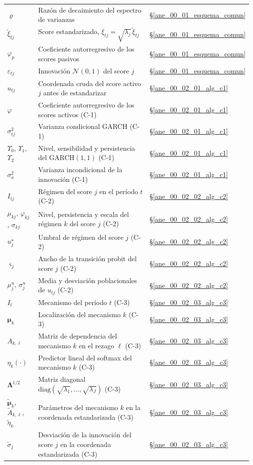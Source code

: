 \begin{longtable}{p{} p{} p{}}
$\varrho$ & Razón de decaimiento del espectro de varianzas & \S\ref{ane_00_01_esquema_comun} \\
$\tilde{\xi}_{tj}$ & Score estandarizado, $\xi_{tj} = \sqrt{\lambda_j}\,\tilde{\xi}_{tj}$ & \S\ref{ane_00_01_esquema_comun} \\
$\varphi_p$ & Coeficiente autorregresivo de los scores pasivos & \S\ref{ane_00_01_esquema_comun} \\
$\varepsilon_{tj}$ & Innovación $\mathcal{N}(0,1)$ del score $j$ & \S\ref{ane_00_01_esquema_comun} \\
$u_{tj}$ & Coordenada cruda del score activo $j$ antes de estandarizar & \S\ref{ane_00_02_01_alg_c1} \\
$\varphi$ & Coeficiente autorregresivo de los scores activos (C-1) & \S\ref{ane_00_02_01_alg_c1} \\
$\sigma_{tj}^2$ & Varianza condicional GARCH (C-1) & \S\ref{ane_00_02_01_alg_c1} \\
$\Upsilon_0$, $\Upsilon_1$, $\Upsilon_2$ & Nivel, sensibilidad y persistencia del GARCH$(1,1)$ (C-1) & \S\ref{ane_00_02_01_alg_c1} \\
$\sigma_a^2$ & Varianza incondicional de la innovación (C-1) & \S\ref{ane_00_02_01_alg_c1} \\
$I_{tj}$ & Régimen del score $j$ en el período $t$ (C-2) & \S\ref{ane_00_02_02_alg_c2} \\
$\mu_{kj}$, $\varphi_{kj}$, $\sigma_{kj}$ & Nivel, persistencia y escala del régimen $k$ del score $j$ (C-2) & \S\ref{ane_00_02_02_alg_c2} \\
$u_j^{\star}$ & Umbral de régimen del score $j$ (C-2) & \S\ref{ane_00_02_02_alg_c2} \\
$\varsigma_j$ & Ancho de la transición probit del score $j$ (C-2) & \S\ref{ane_00_02_02_alg_c2} \\
$\mu_j^{u}$, $\sigma_j^{u}$ & Media y desviación poblacionales de $u_{tj}$ (C-2) & \S\ref{ane_00_02_02_alg_c2} \\
$I_t$ & Mecanismo del período $t$ (C-3) & \S\ref{ane_00_02_03_alg_c3} \\
$\boldsymbol{\mu}_k$ & Localización del mecanismo $k$ (C-3) & \S\ref{ane_00_02_03_alg_c3} \\
$A_{k,\ell}$ & Matriz de dependencia del mecanismo $k$ en el rezago $\ell$ (C-3) & \S\ref{ane_00_02_03_alg_c3} \\
$\eta_k(\cdot)$ & Predictor lineal del softmax del mecanismo $k$ (C-3) & \S\ref{ane_00_02_03_alg_c3} \\
$\boldsymbol{\Lambda}^{1/2}$ & Matriz diagonal $\mathrm{diag}(\sqrt{\lambda_1}, \dots, \sqrt{\lambda_J})$ (C-3) & \S\ref{ane_00_02_03_alg_c3} \\
$\tilde{\boldsymbol{\mu}}_k$, $\tilde{A}_{k,\ell}$, $\tilde{\eta}_k$ & Parámetros del mecanismo $k$ en la coordenada estandarizada (C-3) & \S\ref{ane_00_02_03_alg_c3} \\
$\tilde{\sigma}_j$ & Desviación de la innovación del score $j$ en la coordenada estandarizada (C-3) & \S\ref{ane_00_02_03_alg_c3} \\
\end{longtable}
\setlength{\tabcolsep}{6pt} %
\normalsize
